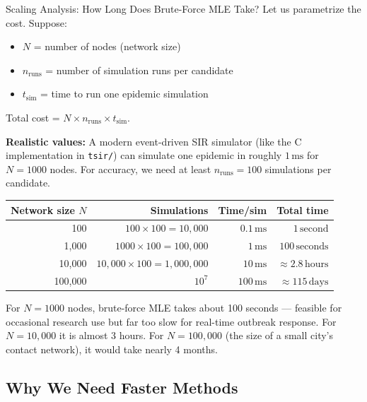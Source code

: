 \begin{examplebox}{Scaling Analysis: How Long Does Brute-Force MLE Take?}
Let us parametrize the cost. Suppose:
\begin{itemize}
    \item $N$ = number of nodes (network size)
    \item $n_{\text{runs}}$ = number of simulation runs per candidate
    \item $t_{\text{sim}}$ = time to run one epidemic simulation
\end{itemize}

Total cost = $N \times n_{\text{runs}} \times t_{\text{sim}}$.

\bigskip
\textbf{Realistic values:}
A modern event-driven SIR simulator (like the C implementation in
\texttt{tsir/}) can simulate one epidemic in roughly $1\,\text{ms}$ for
$N = 1000$ nodes. For accuracy, we need at least $n_{\text{runs}} = 100$
simulations per candidate.

\medskip
\begin{center}
\begin{tabular}{rrrr}
\toprule
\textbf{Network size $N$} & \textbf{Simulations} & \textbf{Time/sim} & \textbf{Total time} \\
\midrule
100     & $100 \times 100 = 10{,}000$       & $0.1\,\text{ms}$ & $1\,\text{second}$    \\
1,000   & $1000 \times 100 = 100{,}000$     & $1\,\text{ms}$   & $100\,\text{seconds}$ \\
10,000  & $10{,}000 \times 100 = 1{,}000{,}000$ & $10\,\text{ms}$ & $\approx 2.8\,\text{hours}$ \\
100,000 & $10^7$                            & $100\,\text{ms}$ & $\approx 115\,\text{days}$ \\
\bottomrule
\end{tabular}
\end{center}

\medskip
For $N = 1000$ nodes, brute-force MLE takes about 100 seconds — feasible
for occasional research use but far too slow for real-time outbreak response.
For $N = 10{,}000$ it is almost 3 hours. For $N = 100{,}000$ (the size of a
small city's contact network), it would take nearly 4 months.
\end{examplebox}

\subsection{Why We Need Faster Methods}

